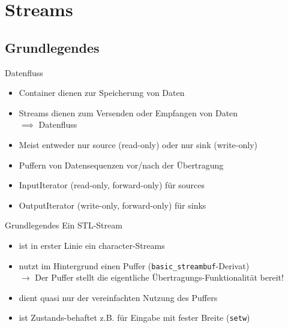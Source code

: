 \section{Streams}


\subsection{Grundlegendes}

\begin{frame}{Datenfluss}
	\begin{itemize}
		\item Container dienen zur Speicherung von Daten
		\item Streams dienen zum Versenden oder Empfangen von Daten\\
		      $\implies$ Datenfluss
		\item Meist entweder nur source (read-only) oder nur sink (write-only)
		\item Puffern von Datensequenzen vor/nach der Übertragung
		\item InputIterator (read-only, forward-only) für sources
		\item OutputIterator (write-only, forward-only) für sinks
	\end{itemize}
\end{frame}

\begin{frame}{Grundlegendes}
	Ein STL-Stream
	\begin{itemize}
		\item ist in erster Linie ein character-Streams
		\item nutzt im Hintergrund einen Puffer (\texttt{basic\_streambuf}-Derivat)\\
			$\rightarrow$ Der Puffer stellt die eigentliche Übertragungs-Funktionalität bereit!
		\item dient quasi nur der vereinfachten Nutzung des Puffers
		\item ist Zustands-behaftet z.B. für Eingabe mit fester Breite (\texttt{setw})
	\end{itemize}
\end{frame}


